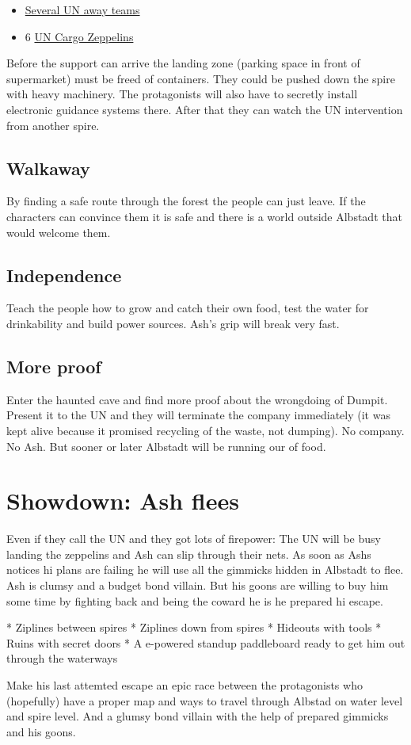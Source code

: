 \begin{itemize}
    \item \hyperref[sec: UN away team]{Several UN away teams}
    \item 6 \hyperref[sec: UN Cargo Zeppelins]{UN Cargo Zeppelins}
\end{itemize}

Before the support can arrive the landing zone (parking space in front of supermarket) must be freed of containers. They could be pushed down the spire with heavy machinery. The protagonists will also have to secretly install electronic guidance systems there. After that they can watch the UN intervention from another spire.

\subsection{Walkaway}

By finding a safe route through the forest the people can just leave. If the characters can convince them it is safe and there is a world outside Albstadt that would welcome them.

\subsection{Independence}

Teach the people how to grow and catch their own food, test the water for drinkability and build power sources. Ash's grip will break very fast.

\subsection{More proof}

Enter the haunted cave and find more proof about the wrongdoing of Dumpit. Present it to the UN and they will terminate the company immediately (it was kept alive because it promised recycling of the waste, not dumping). No company. No Ash. But sooner or later Albstadt will be running our of food.

\section{Showdown: Ash flees}
Even if they call the UN and they got lots of firepower: The UN will be busy landing the zeppelins and Ash can slip through their nets. As soon as Ashs notices hi plans are failing he will use all the gimmicks hidden in Albstadt to flee. Ash is clumsy and a budget bond villain. But his goons are willing to buy him some time by fighting back and being the coward he is he prepared hi escape.

* Ziplines between spires
* Ziplines down from spires
* Hideouts with tools
* Ruins with secret doors
* A e-powered standup paddleboard ready to get him out through the waterways

Make his last attemted escape an epic race between the protagonists who (hopefully) have a proper map and ways to travel through Albstad on water level and spire level. And a glumsy bond villain with the help of prepared gimmicks and his goons.
